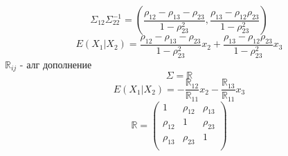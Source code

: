 \documentclass[a4paper]{article}
\begin{document}
\[
    \Sigma_{12}\Sigma_{22}^{-1} = \left( \frac{\rho_{12}- \rho_{13} - \rho_{23}}{
        1 - \rho_{23}^2} , \frac{\rho_{13} - \rho_{12}\rho_{23}}{1 - \rho_{23}^2} 
        \right)
\]
\begin{equation}
    E(X_1 | X_2) = \frac{\rho_{12}- \rho_{13} - \rho_{23}}{
        1 - \rho_{23}^2} x_2 + \frac{\rho_{13} - \rho_{12}\rho_{23}}{1 - \rho_{23}^2}
        x_3
\end{equation}
$ \mathbb{R}_{ij} $ - алг дополнение
\[
    \Sigma = \mathbb{R}
\]
\[
    E(X_1 | X_2) = - \frac{\mathbb{R}_{12}}{\mathbb{R}_{11}} x_2 - 
        \frac{\mathbb{R}_{13}}{\mathbb{R}_{11}} x_3
\]
\[
    \mathbb{R} = \begin{pmatrix}
        1 & \rho_{12} & \rho_{13}\\
    \rho_{12} & 1 & \rho_{23}\\
    \rho_{13} & \rho_{23} & 1\\
    
\end{pmatrix}
\]
\end{document}

